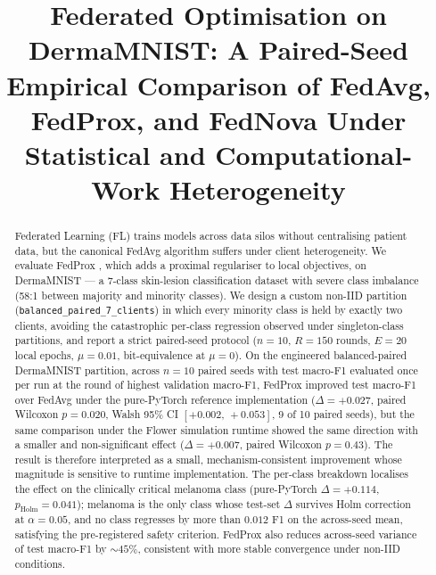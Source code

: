 \documentclass[11pt,a4paper]{report}
\title{Federated Optimisation on DermaMNIST: A Paired-Seed Empirical
Comparison of FedAvg, FedProx, and FedNova Under Statistical and
Computational-Work Heterogeneity}
\author{}
\date{}
\begin{document}
\maketitle

\begin{abstract}
Federated Learning (FL) trains models across data silos without
centralising patient data, but the canonical FedAvg algorithm
\citep{mcmahan2017fedavg} suffers under client heterogeneity. We
evaluate FedProx \citep{li2020fedprox}, which adds a proximal
regulariser to local objectives, on DermaMNIST --- a 7-class
skin-lesion classification dataset with severe class imbalance
(58:1 between majority and minority classes). We design a custom
non-IID partition (\texttt{balanced\_paired\_7\_clients}) in which
every minority class is held by exactly two clients, avoiding the
catastrophic per-class regression observed under singleton-class
partitions, and report a strict paired-seed protocol ($n=10$,
$R = 150$ rounds, $E = 20$ local epochs, $\mu = 0.01$,
bit-equivalence at $\mu = 0$).
On the engineered balanced-paired DermaMNIST partition, across
$n = 10$ paired seeds with test macro-F1 evaluated once per run at
the round of highest validation macro-F1, FedProx improved test
macro-F1 over FedAvg under the pure-PyTorch reference implementation
($\Delta = +0.027$, paired Wilcoxon $p = 0.020$, Walsh 95\% CI
$[+0.002,\,+0.053]$, 9 of 10 paired seeds), but the same comparison
under the Flower simulation runtime showed the same direction with a
smaller and non-significant effect ($\Delta = +0.007$, paired
Wilcoxon $p = 0.43$). The result is therefore interpreted as a
small, mechanism-consistent improvement whose magnitude is sensitive
to runtime implementation. The
per-class breakdown localises the effect on the clinically critical
melanoma class (pure-PyTorch $\Delta = +0.114$,
$p_{\text{Holm}} = 0.041$); melanoma is the only class whose
test-set $\Delta$ survives Holm correction at $\alpha = 0.05$, and
no class regresses by more than $0.012$ F1 on the across-seed mean,
satisfying the pre-registered safety criterion. FedProx also
reduces across-seed variance of test macro-F1 by $\sim 45\%$,
consistent with more stable convergence under non-IID conditions.
\end{abstract}

\tableofcontents
\newpage

\end{document}
